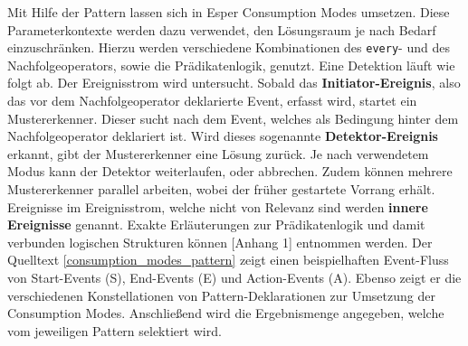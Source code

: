 Mit Hilfe der Pattern lassen sich in Esper Consumption Modes umsetzen.
Diese Parameterkontexte werden dazu verwendet, den Lösungsraum je nach Bedarf einzuschränken.
Hierzu werden verschiedene Kombinationen des \texttt{every}- und des Nachfolgeoperators, sowie die Prädikatenlogik, genutzt.
Eine Detektion läuft wie folgt ab.
Der Ereignisstrom wird untersucht. Sobald das \textbf{Initiator-Ereignis}, also das vor dem Nachfolgeoperator deklarierte Event, erfasst wird, startet ein Mustererkenner. Dieser sucht nach dem Event, welches als Bedingung hinter dem Nachfolgeoperator deklariert ist. Wird dieses sogenannte \textbf{Detektor-Ereignis} erkannt, gibt der Mustererkenner eine Lösung zurück. Je nach verwendetem Modus kann der Detektor weiterlaufen, oder abbrechen. Zudem können mehrere Mustererkenner parallel arbeiten, wobei der früher gestartete Vorrang erhält.
Ereignisse im Ereignisstrom, welche nicht von Relevanz sind werden \textbf{innere Ereignisse} genannt.
Exakte Erläuterungen zur Prädikatenlogik und damit verbunden logischen Strukturen können \cite{CEP2017}[Anhang 1] entnommen werden.
Der Quelltext \ref{consumption_modes_pattern} zeigt einen beispielhaften Event-Fluss von Start-Events (S), End-Events (E) und Action-Events (A). Ebenso zeigt er die verschiedenen Konstellationen von Pattern-Deklarationen zur Umsetzung der Consumption Modes. Anschließend wird die Ergebnismenge angegeben, welche vom jeweiligen Pattern selektiert wird.

